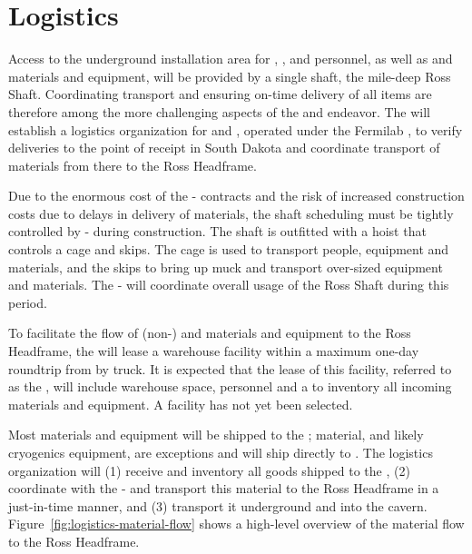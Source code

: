 \section{Logistics}
\label{sec:fdsp-tc-log}


Access to the underground installation area for , , and  personnel, as well as   and   materials and equipment, will be provided by a single shaft, the mile-deep Ross Shaft. Coordinating transport and ensuring on-time delivery of all items %
are therefore among the more challenging aspects of the  and  endeavor. 
The  will establish a logistics organization for  and , operated under the Fermilab , to verify deliveries to the point of receipt in South Dakota and coordinate transport of materials from there  to the Ross Headframe.   


Due to the enormous cost of the - contracts and the risk of increased construction costs due to %
delays in delivery of materials, the %
shaft scheduling must be tightly controlled by - during construction. %
The shaft is outfitted with a hoist that controls a cage and skips. The cage is used to transport people, equipment and materials, and the skips to bring up muck and transport over-sized equipment and materials. The -  will coordinate overall usage of the Ross Shaft during this period.


To facilitate the flow of (non-)  and  materials and equipment to the Ross Headframe, the  will %
lease a warehouse facility within a maximum one-day roundtrip from  by truck. It is expected that the lease of this facility, referred to as the , will include warehouse space, personnel and a  to inventory all incoming materials and equipment. A facility has not yet been selected. 

Most materials and equipment will be shipped to the ;  material, and likely cryogenics equipment, are exceptions and will ship directly to . 
The  logistics  organization will %
(1) receive and inventory all  goods shipped to the , (2) coordinate with the -  and transport this material to the Ross Headframe in a just-in-time manner, and (3) transport it underground and into the cavern. 
Figure~\ref{fig:logistics-material-flow} shows a high-level overview of the material flow to the Ross Headframe.

